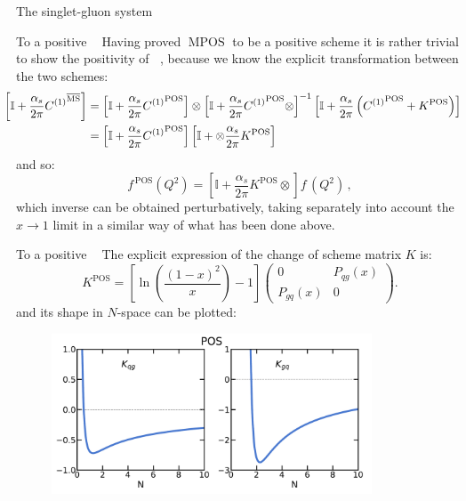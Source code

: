 \documentclass[9pt]{beamer}
\DeclareMathOperator{\msbar}{\overline{MS}}
\DeclareMathOperator{\pos}{POS}
\DeclareMathOperator{\mpos}{MPOS}
\begin{document}
\begin{frame}{The singlet-gluon system}
\end{frame}

\begin{frame}{To a positive $\msbar$}
    Having proved $\mpos$ to be a positive scheme it is rather trivial to show
    the positivity of $\msbar$, because we know the explicit transformation
    between the two schemes:
    \begin{align*}
    \hspace*{-12pt}\left[\mathbb{I}
    +\frac{\alpha_s}{2\pi} {C^{(1)}}^{\msbar}\right]&=\left[\mathbb{I}
      +\frac{\alpha_s}{2\pi} {C^{(1)}}^{\pos}\right]\otimes\left[\mathbb{I}
      +\frac{\alpha_s}{2\pi} {C^{(1)}}^{\pos}\otimes\right]^{-1}\left[\mathbb{I}
      +\frac{\alpha_s}{2\pi}  \left({C^{(1)}}^{\pos} +K^{\pos}\right)\right]\\  
    &=\left[\mathbb{I}
      +\frac{\alpha_s}{2\pi} {C^{(1)}}^{\pos}
      \right]\left[\mathbb{I}
      + \otimes \frac{\alpha_s}{2\pi}  K^{\pos}\right]
    \end{align*}
    and so:
    \begin{equation*}
     f^{\,\pos}(Q^2)=\left[\mathbb{I}
      +\frac{\alpha_s}{2\pi}  K^{\pos}\otimes\right] f^{\,\msbar}(Q^2)\,,
    \end{equation*}
    which inverse can be obtained perturbatively, taking separately into
    account the $x \to 1$ limit in a similar way of what has been done above.
\end{frame}

\begin{frame}{To a positive $\msbar$}
    The explicit expression of the change of scheme matrix $K$ is:
    \begin{equation*}
        K^{\pos}=\left[\ln\left(\frac{(1-x)^2}{x}\right) - 1\right]
        \left(\begin{array}{cc} 0 & P_{qg}(x) \\
        P_{gq}(x) & 0\end{array}\right).
    \end{equation*}
    and its shape in $N$-space can be plotted:
    \begin{figure}
      \includegraphics[width=0.85\textwidth]{pictures/kmatrix-offdiagonal-9}
    \end{figure}
\end{frame}
\end{document}
